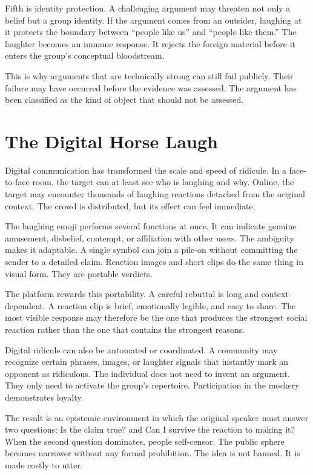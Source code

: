 ﻿\documentclass[12pt,a4paper]{book}
\begin{document}
Fifth is identity protection. A challenging argument may threaten not only a belief but a group identity. If the argument comes from an outsider, laughing at it protects the boundary between ``people like us'' and ``people like them.'' The laughter becomes an immune response. It rejects the foreign material before it enters the group's conceptual bloodstream.

This is why arguments that are technically strong can still fail publicly. Their failure may have occurred before the evidence was assessed. The argument has been classified as the kind of object that should not be assessed.

\section{The Digital Horse Laugh}

Digital communication has transformed the scale and speed of ridicule. In a face-to-face room, the target can at least see who is laughing and why. Online, the target may encounter thousands of laughing reactions detached from the original context. The crowd is distributed, but its effect can feel immediate.

The laughing emoji performs several functions at once. It can indicate genuine amusement, disbelief, contempt, or affiliation with other users. The ambiguity makes it adaptable. A single symbol can join a pile-on without committing the sender to a detailed claim. Reaction images and short clips do the same thing in visual form. They are portable verdicts.

The platform rewards this portability. A careful rebuttal is long and context-dependent. A reaction clip is brief, emotionally legible, and easy to share. The most visible response may therefore be the one that produces the strongest social reaction rather than the one that contains the strongest reasons.

Digital ridicule can also be automated or coordinated. A community may recognize certain phrases, images, or laughter signals that instantly mark an opponent as ridiculous. The individual does not need to invent an argument. They only need to activate the group's repertoire. Participation in the mockery demonstrates loyalty.

The result is an epistemic environment in which the original speaker must answer two questions: Is the claim true? and Can I survive the reaction to making it? When the second question dominates, people self-censor. The public sphere becomes narrower without any formal prohibition. The idea is not banned. It is made costly to utter.
\end{document}
